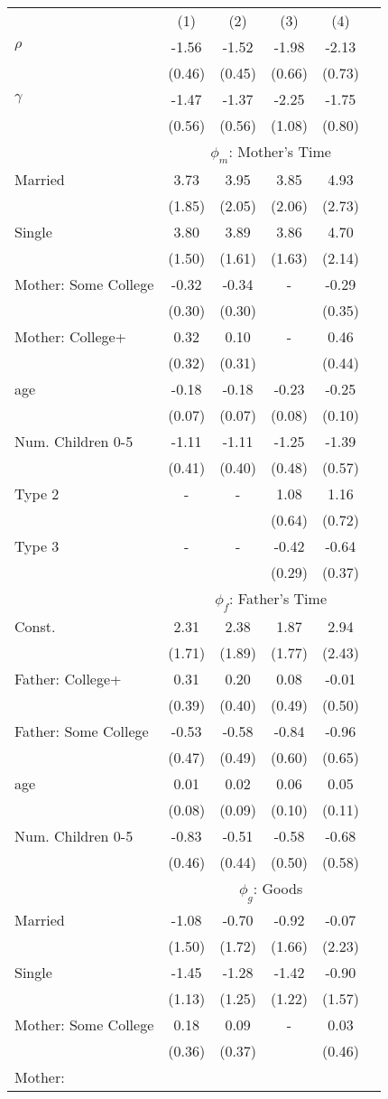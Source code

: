 \begin{tabular}{lccccc}\\\toprule
&(1)&(2)&(3)&(4)&\\\cmidrule(r){2-6}$\rho$&-1.56&-1.52&-1.98&-2.13&\\
&(0.46)&(0.45)&(0.66)&(0.73)&\\
$\gamma$&-1.47&-1.37&-2.25&-1.75&\\
&(0.56)&(0.56)&(1.08)&(0.80)&\\
& \multicolumn{5}{c}{$\phi_{m}$: Mother's Time}\\\cmidrule(r){2-6}Married&3.73&3.95&3.85&4.93&\\&(1.85)&(2.05)&(2.06)&(2.73)&\\Single&3.80&3.89&3.86&4.70&\\&(1.50)&(1.61)&(1.63)&(2.14)&\\Mother: Some College&-0.32&-0.34&-&-0.29&\\&(0.30)&(0.30)&&(0.35)&\\Mother: College+&0.32&0.10&-&0.46&\\&(0.32)&(0.31)&&(0.44)&\\age&-0.18&-0.18&-0.23&-0.25&\\&(0.07)&(0.07)&(0.08)&(0.10)&\\Num. Children 0-5&-1.11&-1.11&-1.25&-1.39&\\&(0.41)&(0.40)&(0.48)&(0.57)&\\Type 2&-&-&1.08&1.16&\\&&&(0.64)&(0.72)&\\Type 3&-&-&-0.42&-0.64&\\&&&(0.29)&(0.37)&\\& \multicolumn{5}{c}{$\phi_{f}$: Father's Time}\\\cmidrule(r){2-6}Const.&2.31&2.38&1.87&2.94&\\&(1.71)&(1.89)&(1.77)&(2.43)&\\Father: College+&0.31&0.20&0.08&-0.01&\\&(0.39)&(0.40)&(0.49)&(0.50)&\\Father: Some College&-0.53&-0.58&-0.84&-0.96&\\&(0.47)&(0.49)&(0.60)&(0.65)&\\age&0.01&0.02&0.06&0.05&\\&(0.08)&(0.09)&(0.10)&(0.11)&\\Num. Children 0-5&-0.83&-0.51&-0.58&-0.68&\\&(0.46)&(0.44)&(0.50)&(0.58)&\\& \multicolumn{5}{c}{$\phi_{g}$: Goods}\\\cmidrule(r){2-6}Married&-1.08&-0.70&-0.92&-0.07&\\&(1.50)&(1.72)&(1.66)&(2.23)&\\Single&-1.45&-1.28&-1.42&-0.90&\\&(1.13)&(1.25)&(1.22)&(1.57)&\\Mother: Some College&0.18&0.09&-&0.03&\\&(0.36)&(0.37)&&(0.46)&\\Mother: 
\end{tabular}
